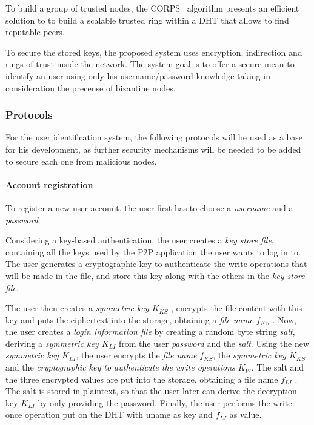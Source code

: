 \documentclass[12pt,spanish]{article}
\begin{document}
To build a group of trusted nodes, the CORPS~\cite{rosas2011corps} algorithm
presents an efficient solution to to build a scalable
trusted ring within a DHT that allows to find reputable
peers.


To secure the stored keys, the proposed system uses encryption, indirection and
rings of trust inside the network. The system goal is to offer a secure mean to
identify an user using only his username/password knowledge taking in
consideration the precense of bizantine nodes.

\subsubsection{Protocols}
For the user identification system, the following protocols will be used as a
base for his development, as further security mechanisms will be needed to be
added to secure each one from malicious nodes.

\paragraph{Account registration}

To register a new user account, the user first
has to choose a \textit{username} and a \textit{password}.

Considering a key-based authentication, the user creates a \textit{key store file}, containing all the
keys used by the P2P application the user wants to log in to.
The user generates a cryptographic key to authenticate the write operations
that will be made in the file, and store this key along with the others in the
\textit{key store file}.


The user then creates a \textit{symmetric key $K_{KS}$} ,
encrypts the file content with this key and puts the ciphertext
into the storage, obtaining a \textit{file name $f_{KS}$} . Now, the user
creates a \textit{login information file} by creating a random
byte string \textit{salt}, deriving a \textit{symmetric key $K_{LI}$} from the user
\textit{password} and the \textit{salt}.
Using the new \textit{ symmetric key $K_{LI}$}, the user encrypts the
\textit{file name $f_{KS}$},
the \textit{symmetric key $K_{KS}$} and the \textit{cryptographic key to
authenticate the write operations $K_W$}.
 The salt and the three encrypted values are put
into the storage, obtaining a file name $f_{LI}$ . The salt is stored
in plaintext, so that the user later can derive the decryption
key $K_{LI}$ by only providing the password. Finally, the user
performs the write-once operation put on the DHT with
uname as key and $f_{LI}$ as value.
\end{document}
